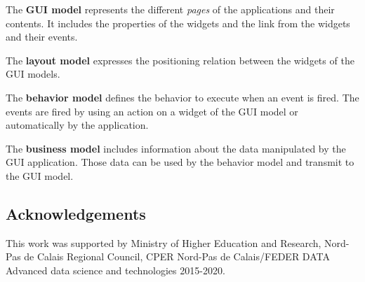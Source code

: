 \documentclass[conference]{IEEEtran}
\begin{document}
The \textbf{GUI model} represents the different \textit{pages} of the applications and their contents.
It includes the properties of the widgets and the link from the widgets and their events.

The \textbf{layout model} expresses the positioning relation between the widgets of the GUI models.

The \textbf{behavior model} defines the behavior to execute when
    an event is fired.
The events are fired by using an action on a widget of the GUI model or
    automatically by the application.

The \textbf{business model} includes information about the data manipulated
    by the GUI application.
Those data can be used by the behavior model and transmit to the
    GUI model.

\subsection*{Acknowledgements} 
This work was supported by Ministry of Higher Education and Research, Nord-Pas de Calais Regional Council, CPER Nord-Pas de Calais/FEDER DATA Advanced data science and technologies 2015-2020.

%


\end{document}

